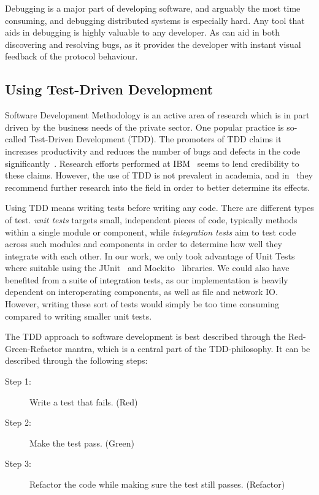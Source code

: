 Debugging is a major part of developing software, and arguably the most
time consuming, and debugging distributed systems is especially hard.
Any tool that aids in debugging is highly valuable to any developer. As
\demo{} can aid in both discovering and resolving bugs, as it provides
the developer with instant visual feedback of the protocol behaviour.


\subsection{Using Test-Driven Development}

Software Development Methodology is an active area of research
which is in part driven by the business needs of the private
sector\cite{janzen2005test}. One popular practice is so-called Test-Driven
Development (TDD). The promoters of TDD claims it increases
productivity and reduces the number of bugs and defects in the
code significantly~\cite{beck2003test}. Research
efforts performed at IBM~\cite{maximilien2003assessing} seems to
lend credibility to these claims. However, the use of TDD is not
prevalent in academia, and in~\cite{janzen2005test} they
recommend further research into the field in order to better
determine its effects.

Using TDD means writing tests before writing any code. There are
different types of test. \emph{unit tests} targets small,
independent pieces of code, typically methods within a single
module or component, while \emph{integration tests} aim to test
code across such modules and components in order to determine
how well they integrate with each other. In our work, we only
took advantage of Unit Tests where suitable using the
JUnit~\cite{junit} and Mockito~\cite{mockito} libraries.
We could also have benefited from a suite of integration tests,
as our implementation is heavily dependent on interoperating
components, as well as file and network IO\@. However, writing
these sort of tests would simply be too time consuming compared
to writing smaller unit tests.

The TDD approach to software development is best described through the
Red-Green-Refactor mantra, which is a central part of the
TDD-philosophy. It can be described through the following steps:

\begin{description}
    \item[Step 1:] Write a test that fails. (Red)
    \item[Step 2:] Make the test pass. (Green)
    \item[Step 3:] Refactor the code while making sure the test
        still passes. (Refactor)
\end{description}

